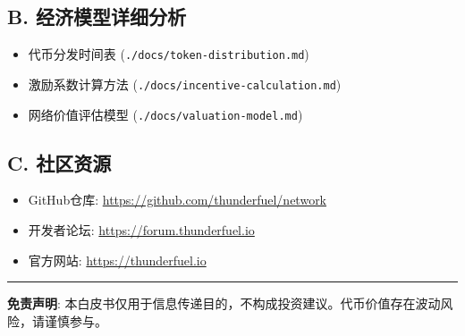 \documentclass[12pt,a4paper]{article}
\begin{document}
\subsection*{B. 经济模型详细分析}
\begin{itemize}
    \item 代币分发时间表 (\texttt{./docs/token-distribution.md})
    \item 激励系数计算方法 (\texttt{./docs/incentive-calculation.md})
    \item 网络价值评估模型 (\texttt{./docs/valuation-model.md})
\end{itemize}

\subsection*{C. 社区资源}
\begin{itemize}
    \item GitHub仓库: \url{https://github.com/thunderfuel/network}
    \item 开发者论坛: \url{https://forum.thunderfuel.io}
    \item 官方网站: \url{https://thunderfuel.io}
\end{itemize}

\vspace{1cm}
\hrule
\vspace{0.5cm}
\textbf{免责声明}: 本白皮书仅用于信息传递目的，不构成投资建议。代币价值存在波动风险，请谨慎参与。
\end{document}

